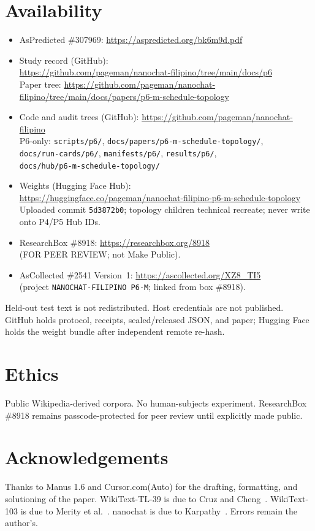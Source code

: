 \documentclass[11pt,a4paper]{article}
\begin{document}
\section*{Availability}
\begin{itemize}[leftmargin=1.6em,itemsep=0.35em]
\item AsPredicted \#307969: \url{https://aspredicted.org/bk6m9d.pdf}
\item Study record (GitHub):\\
\url{https://github.com/pageman/nanochat-filipino/tree/main/docs/p6}\\
Paper tree: \url{https://github.com/pageman/nanochat-filipino/tree/main/docs/papers/p6-m-schedule-topology}
\item Code and audit trees (GitHub): \url{https://github.com/pageman/nanochat-filipino}\\
P6-only: \texttt{scripts/p6/}, \texttt{docs/papers/p6-m-schedule-topology/},\\
\texttt{docs/run-cards/p6/}, \texttt{manifests/p6/}, \texttt{results/p6/},\\
\texttt{docs/hub/p6-m-schedule-topology/}
\item Weights (Hugging Face Hub):\\
\url{https://huggingface.co/pageman/nanochat-filipino-p6-m-schedule-topology}\\
Uploaded commit \texttt{5d3872b0}; topology children technical recreate; never write onto P4/P5 Hub IDs.
\item ResearchBox \#8918: \url{https://researchbox.org/8918}\\
(FOR PEER REVIEW; not Make Public).
\item AsCollected \#2541 Version~1: \url{https://ascollected.org/XZ8_TI5}\\
(project \texttt{NANOCHAT-FILIPINO P6-M}; linked from box \#8918).
\end{itemize}
Held-out test text is not redistributed. Host credentials are not published. GitHub holds protocol, receipts, sealed/released JSON, and paper; Hugging Face holds the weight bundle after independent remote re-hash.

\section*{Ethics}
Public Wikipedia-derived corpora. No human-subjects experiment. ResearchBox \#8918 remains passcode-protected for peer review until explicitly made public.

\section*{Acknowledgements}
Thanks to Manus 1.6 and Cursor.com(Auto) for the drafting, formatting, and solutioning of the paper. WikiText-TL-39 is due to Cruz and Cheng~\cite{cruz2019eval}. WikiText-103 is due to Merity et al.~\cite{merity2017pointer}. nanochat is due to Karpathy~\cite{karpathy2026nanochat}. Errors remain the author's.
\end{document}
